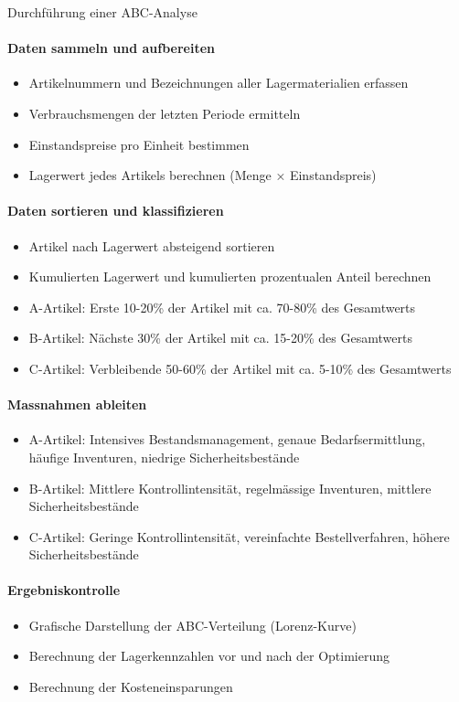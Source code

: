 \begin{KR}{Durchführung einer ABC-Analyse}\\
\paragraph{Daten sammeln und aufbereiten}
\begin{itemize}
    \item Artikelnummern und Bezeichnungen aller Lagermaterialien erfassen
    \item Verbrauchsmengen der letzten Periode ermitteln
    \item Einstandspreise pro Einheit bestimmen
    \item Lagerwert jedes Artikels berechnen (Menge × Einstandspreis)
\end{itemize}

\paragraph{Daten sortieren und klassifizieren}
\begin{itemize}
    \item Artikel nach Lagerwert absteigend sortieren
    \item Kumulierten Lagerwert und kumulierten prozentualen Anteil berechnen
    \item A-Artikel: Erste 10-20\% der Artikel mit ca. 70-80\% des Gesamtwerts
    \item B-Artikel: Nächste 30\% der Artikel mit ca. 15-20\% des Gesamtwerts
    \item C-Artikel: Verbleibende 50-60\% der Artikel mit ca. 5-10\% des Gesamtwerts
\end{itemize}

\paragraph{Massnahmen ableiten}
\begin{itemize}
    \item A-Artikel: Intensives Bestandsmanagement, genaue Bedarfsermittlung, häufige Inventuren, niedrige Sicherheitsbestände
    \item B-Artikel: Mittlere Kontrollintensität, regelmässige Inventuren, mittlere Sicherheitsbestände
    \item C-Artikel: Geringe Kontrollintensität, vereinfachte Bestellverfahren, höhere Sicherheitsbestände
\end{itemize}

\paragraph{Ergebniskontrolle}
\begin{itemize}
    \item Grafische Darstellung der ABC-Verteilung (Lorenz-Kurve)
    \item Berechnung der Lagerkennzahlen vor und nach der Optimierung
    \item Berechnung der Kosteneinsparungen
\end{itemize}
\end{KR}

